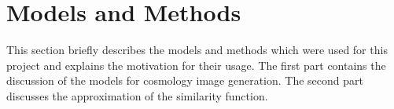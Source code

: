 \documentclass[10pt,conference,compsocconf]{IEEEtran}
\newcommand\TODO[1]{\textcolor{red}{#1}} %
\begin{document}




\section{Models and Methods} \label{sec:models_methods}
This section briefly describes the models and methods which were used for this project and explains the motivation for their usage. The first part contains the discussion of the models for cosmology image generation. The second part discusses the approximation of the similarity function.

\end{document}
